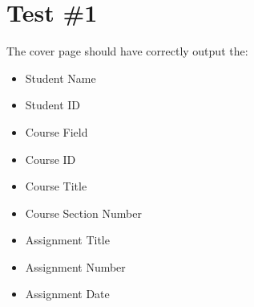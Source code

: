 \documentclass[12pt]{article}
\begin{document}

\tableofcontents

\section{Test \#1}

The cover page should have correctly output the:

\begin{itemize}
    \item Student Name
    \item Student ID
    \item Course Field
    \item Course ID
    \item Course Title
    \item Course Section Number
    \item Assignment Title
    \item Assignment Number
    \item Assignment Date
\end{itemize}
\end{document}

